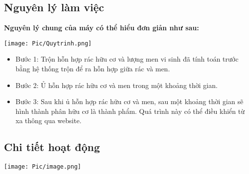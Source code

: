 \documentclass[12pt, a4paper]{article}
\begin{document}
\subsection{Nguyên lý làm việc}
\textbf{Nguyên lý chung của máy có thể hiểu đơn giản như sau:}\\
\centerline{\texttt{[image: Pic/Quytrinh.png]}} %
\begin{itemize}
    \item Bước 1: Trộn hỗn hợp rác hữu cơ và lượng men vi sinh đã tính toán trước bằng hệ thống trộn để ra hỗn hợp giữa rác và men.
    \item Bước 2: Ủ hỗn hợp rác hữu cơ và men trong một khoảng thời gian.
    \item Bước 3: Sau khi ủ hỗn hợp rác hữu cơ và men, sau một khoảng thời gian sẽ hình thành phân hữu cơ là thành phẩm. Quá trình này có thể điều khiển từ xa thông qua website.
\end{itemize}

\subsection{Chi tiết hoạt động}
\centerline{\texttt{[image: Pic/image.png]}}
\end{document}
